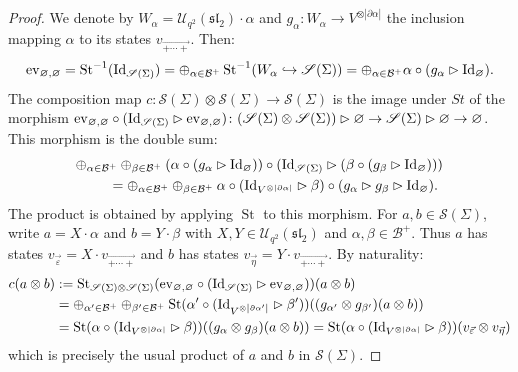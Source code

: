 \documentclass[pdftex]{sigma}%
\numberwithin{equation}{section}
\newcommand{\abss}[1]{\left\vert #1 \right\vert}
\newcommand{\St}{\operatorname{St}}
\newcommand{\Uq}{\mathcal{U}_{q^2}(\mathfrak{sl}_2)}
\begin{document}
\begin{proof}
 We denote by $W_\alpha = \Uq\cdot \alpha$ and $g_\alpha\colon W_\alpha \to V^{\otimes \abss{\partial \alpha}}$ the inclusion mapping $\alpha$ to its states $v_{\overrightarrow{+\cdots +}}$. Then:
 \[
 {\rm ev}_{\varnothing,\varnothing} =\St^{-1}({\rm Id}_{\mathscr{S}(\Sigma)}) = \oplus_{\alpha \in \mathcal{B}^+} \St^{-1}(W_\alpha \hookrightarrow \mathscr{S}(\Sigma)) = \oplus_{\alpha \in \mathcal{B}^+}\alpha \circ (g_\alpha \rhd {\rm Id}_\varnothing).
 \]
The composition map $c \colon \mathscr{S}(\Sigma) \otimes \mathscr{S}(\Sigma) \to \mathscr{S}(\Sigma)$ is the image under $St$ of the morphism ${\rm ev}_{\varnothing,\varnothing} \circ ({\rm Id}_{\mathscr{S}(\Sigma)} \rhd {\rm ev}_{\varnothing,\varnothing}) \colon (\mathscr{S}(\Sigma) \otimes \mathscr{S}(\Sigma))\rhd \varnothing \to \mathscr{S}(\Sigma) \rhd \varnothing\to\varnothing$. This morphism is the double sum:
\begin{gather*}
\oplus_{\alpha \in \mathcal{B}^+}\oplus_{\beta \in \mathcal{B}^+}(\alpha \circ (g_\alpha \rhd {\rm Id}_\varnothing))\circ ({\rm Id}_{\mathscr{S}(\Sigma)} \rhd (\beta \circ (g_\beta \rhd {\rm Id}_\varnothing)))
\\ \qquad
{}=\oplus_{\alpha \in \mathcal{B}^+}\oplus_{\beta \in \mathcal{B}^+}\alpha \circ ({\rm Id}_{V^{\otimes \abss{\partial \alpha}}}\rhd \beta) \circ (g_\alpha \rhd g_\beta \rhd {\rm Id}_\varnothing) .
\end{gather*}
The product is obtained by applying $\St$ to this morphism. For $a,b \in \mathscr{S}(\Sigma)$, write $a=X\cdot \alpha$ and $b=Y\cdot \beta$ with $X,Y \in \Uq$ and $\alpha,\beta \in \mathcal{B}^+$. Thus $a$ has states $v_{\vec{\varepsilon}} = X \cdot v_{\overrightarrow{+\cdots +}}$ and $b$ has states $v_{\vec{\eta}}=Y \cdot v_{\overrightarrow{+\cdots +}}$. By naturality:
\begin{align*}
c(a\otimes b) &:= \St_{\mathscr{S}(\Sigma)\otimes \mathscr{S}(\Sigma)}({\rm ev}_{\varnothing,\varnothing} \circ ({\rm Id}_{\mathscr{S}(\Sigma)} \rhd {\rm ev}_{\varnothing,\varnothing}))(a\otimes b)
\\
&= \oplus_{\alpha' \in \mathcal{B}^+}\oplus_{\beta' \in \mathcal{B}^+} \St(\alpha' \circ ({\rm Id}_{V^{\otimes \abss{\partial \alpha'}}}\rhd \beta'))((g_{\alpha'} \otimes g_{\beta'})(a \otimes b))
\\
& = \St(\alpha \circ ({\rm Id}_{V^{\otimes \abss{\partial \alpha}}}\rhd \beta))((g_\alpha \otimes g_\beta)(a \otimes b)) = \St(\alpha \circ ({\rm Id}_{V^{\otimes \abss{\partial \alpha}}}\rhd \beta))(v_{\vec{\varepsilon}} \otimes v_{\vec{\eta}})
\end{align*}
which is precisely the usual product of $a$ and $b$ in $\mathscr{S}(\Sigma)$.
\end{proof}
\end{document}
